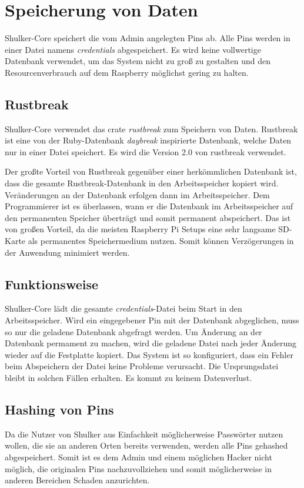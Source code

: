 \chapter{Speicherung von Daten}
Shulker-Core speichert die vom Admin angelegten Pins ab. Alle Pins werden in einer Datei namens \textit{credentials} abgespeichert.
Es wird keine vollwertige Datenbank verwendet, um das System nicht zu groß zu gestalten und den Resourcenverbrauch auf dem 
Raspberry möglichst gering zu halten.

\section{Rustbreak}
Shulker-Core verwendet das crate \textit{rustbreak} zum Speichern von Daten. Rustbreak ist eine von der Ruby-Datenbank \textit{daybreak} inspirierte
Datenbank, welche Daten nur in einer Datei speichert. Es wird die Version 2.0 von rustbreak verwendet.

Der großte Vorteil von Rustbreak gegenüber einer herkömmlichen Datenbank ist, dass die gesamte Rustbreak-Datenbank in den
Arbeitsspeicher kopiert wird. Veränderungen an der Datenbank erfolgen dann im Arbeitsspeicher. Dem Programmierer ist es überlassen,
wann er die Datenbank im Arbeitsspeicher auf den permanenten Speicher überträgt und somit permanent abspeichert. Das ist von großen Vorteil,
da die meisten Raspberry Pi Setups eine sehr langsame SD-Karte als permanentes Speichermedium nutzen. Somit können Verzögerungen in der
Anwendung minimiert werden.

\section{Funktionsweise}
Shulker-Core lädt die gesamte \textit{credentials}-Datei beim Start in den Arbeitsspeicher. Wird ein eingegebener Pin
mit der Datenbank abgeglichen, muss so nur die geladene Datenbank abgefragt werden. Um Änderung an der Datenbank permament zu 
machen, wird die geladene Datei nach jeder Änderung wieder auf die Festplatte kopiert. Das System ist so konfiguriert, dass
ein Fehler beim Abspeichern der Datei keine Probleme verursacht. Die Ursprungsdatei bleibt in solchen Fällen erhalten. Es kommt 
zu keinem Datenverlust.

\section{Hashing von Pins}
Da die Nutzer von Shulker aus Einfachkeit möglicherweise Passwörter nutzen wollen, die sie an anderen Orten bereits verwenden, werden
alle Pins gehashed abgespeichert. Somit ist es dem Admin und einem möglichen Hacker nicht möglich, die originalen Pins nachzuvollziehen und
somit möglicherweise in anderen Bereichen Schaden anzurichten.

